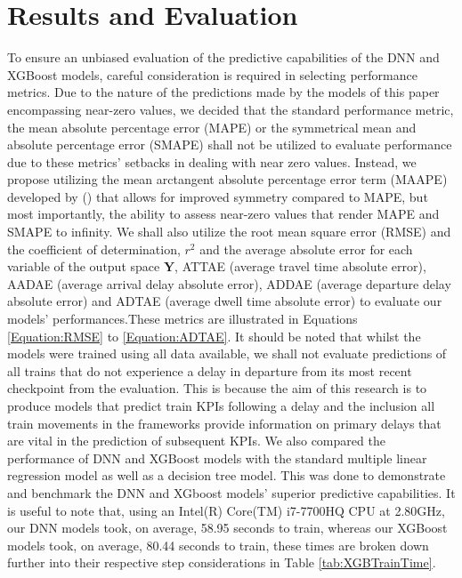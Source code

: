 \documentclass[]{interact}
\theoremstyle{plain}%
\theoremstyle{definition}
\theoremstyle{remark}
\begin{document}
\section{Results and Evaluation}\label{ResultsAndEvaluationSection}
To ensure an unbiased evaluation of the predictive capabilities of the DNN and XGBoost models, careful consideration is required in selecting performance metrics. Due to the nature of the predictions made by the models of this paper encompassing near-zero values, we decided that the standard performance metric, the mean absolute percentage error (MAPE) or the symmetrical mean and absolute percentage error (SMAPE) shall not be utilized to evaluate performance due to these metrics' setbacks in dealing with near zero values. Instead, we propose utilizing the mean arctangent absolute percentage error term  (MAAPE) developed by \citeauthor{KIM16} (\citeyear{KIM16}) that allows for improved symmetry compared to MAPE, but most importantly, the ability to assess near-zero values that render MAPE and SMAPE to infinity. We shall also utilize the root mean square error (RMSE) and the coefficient of determination, $r^2$ and the average absolute error for each variable of the output space $\boldsymbol{Y}$, ATTAE (average travel time absolute error), AADAE (average arrival delay absolute error), ADDAE (average departure delay absolute error) and ADTAE (average dwell time absolute error) to evaluate our models' performances.These metrics are illustrated in Equations \ref{Equation:RMSE} to \ref{Equation:ADTAE}. It should be noted that whilst the models were trained using all data available, we shall not evaluate predictions of all trains that do not experience a delay in departure from its most recent checkpoint from the evaluation. This is because the aim of this research is to produce models that predict train KPIs following a delay and the inclusion all train movements in the frameworks provide information on primary delays that are vital in the prediction of subsequent KPIs. We also compared the performance of DNN and XGBoost models with the standard multiple linear regression model as well as a decision tree model. This was done to demonstrate and benchmark the DNN and XGboost models' superior predictive capabilities. It is useful to note that, using an Intel(R) Core(TM) i7-7700HQ CPU at 2.80GHz, our DNN models took, on average, 58.95 seconds to train, whereas our XGBoost models took, on average, 80.44 seconds to train, these times are broken down further into their respective step considerations in Table \ref{tab:XGBTrainTime}. 
\end{document}

